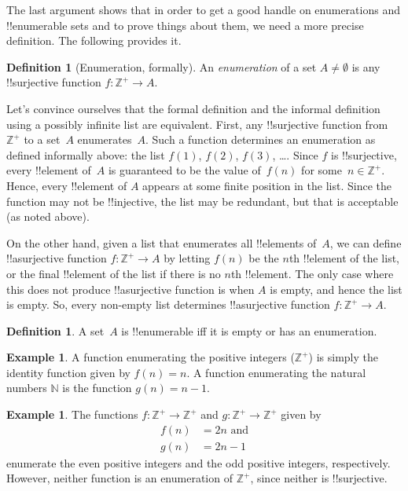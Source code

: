 \documentclass[10pt,a4paper]{article}
\theoremstyle{plain}
\theoremstyle{definition}
\newtheorem{defn}[thm]{Definition}
\newtheorem{ex}[thm]{Example}
\theoremstyle{remark}
\newenvironment{explain}{}{}
\newcommand*{\ollabel}[1]{\label{#1}}
\providecommand{\Nat}{\ensuremath{\mathbb{N}}}
\providecommand{\PosInt}{\mathbb{Z}^{+}}
\begin{document}
The last argument shows that in order to get a good handle on
enumerations and !!{enumerable} sets and to prove things about them,
we need a more precise definition.  The following provides it.

\begin{defn}[Enumeration, formally] 
An \emph{enumeration} of a set $A \neq \emptyset$ is any
!!{surjective} function $f \colon \PosInt \to A$.
\end{defn}

\begin{explain}
Let's convince ourselves that the formal definition and the informal
definition using a possibly infinite list are equivalent. First, any
!!{surjective} function from $\PosInt$ to a set~$A$ enumerates~$A$.
Such a function determines an enumeration as defined informally above:
the list $f(1)$, $f(2)$, $f(3)$, \dots. Since $f$ is !!{surjective},
every !!{element} of~$A$ is guaranteed to be the value of~$f(n)$ for
some~$n \in \PosInt$. Hence, every !!{element} of $A$ appears at some
finite position in the list. Since the function may not be
!!{injective}, the list may be redundant, but that is acceptable (as
noted above).

On the other hand, given a list that enumerates all !!{element}s
of~$A$, we can define !!a{surjective} function $f\colon \PosInt \to A$
by letting $f(n)$ be the $n$th !!{element} of the list, or the final
!!{element} of the list if there is no $n$th !!{element}. The only
case where this does not produce !!a{surjective} function is when $A$ is
empty, and hence the list is empty. So, every non-empty list
determines !!a{surjective} function $f\colon \PosInt \to A$.
\end{explain}

\begin{defn}
  \ollabel{defn:enumerable}
  A set~$A$ is !!{enumerable} iff it is empty or has an enumeration.
\end{defn}

\begin{ex}
A function enumerating the positive integers ($\PosInt$) is simply the
identity function given by $f(n) = n$. A function enumerating the
natural numbers $\Nat$ is the function $g(n) = n - 1$.
\end{ex}

\begin{ex}
The functions $f\colon \PosInt \to \PosInt$ and $g \colon \PosInt \to
\PosInt$ given by
\begin{align*}
f(n) & = 2n \text{ and}\\
g(n) & = 2n - 1
\end{align*}
enumerate the even positive integers and the odd positive integers,
respectively. However, neither function is an enumeration of
$\PosInt$, since neither is !!{surjective}.
\end{ex}
\end{document}
